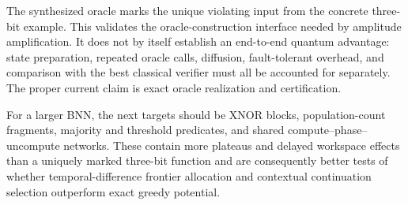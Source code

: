 The synthesized oracle marks the unique violating input from the concrete three-bit example.  This validates the oracle-construction interface needed by amplitude amplification.  It does not by itself establish an end-to-end quantum advantage: state preparation, repeated oracle calls, diffusion, fault-tolerant overhead, and comparison with the best classical verifier must all be accounted for separately.  The proper current claim is exact oracle realization and certification.

For a larger BNN, the next targets should be XNOR blocks, population-count fragments, majority and threshold predicates, and shared compute--phase--uncompute networks.  These contain more plateaus and delayed workspace effects than a uniquely marked three-bit function and are consequently better tests of whether temporal-difference frontier allocation and contextual continuation selection outperform exact greedy potential.

